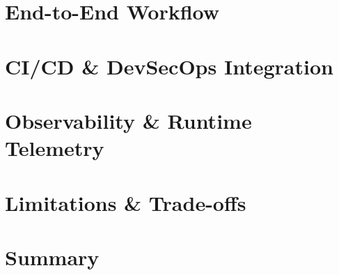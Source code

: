 
\section{End-to-End Workflow}

\section{CI/CD & DevSecOps Integration}

\section{Observability & Runtime Telemetry}

\section{Limitations & Trade-offs}

\section{Summary}
